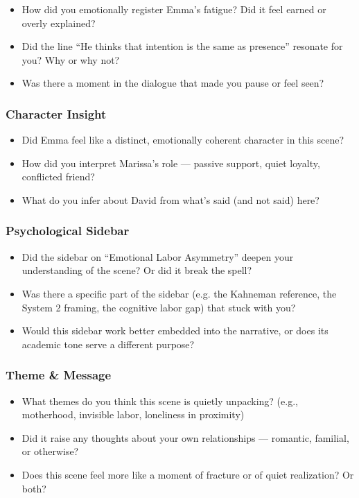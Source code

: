 \begin{itemize}
  \item How did you emotionally register Emma’s fatigue? Did it feel earned or overly explained?
  \item Did the line “He thinks that intention is the same as presence” resonate for you? Why or why not?
  \item Was there a moment in the dialogue that made you pause or feel seen?
\end{itemize}

\subsubsection*{Character Insight}

\begin{itemize}
  \item Did Emma feel like a distinct, emotionally coherent character in this scene?
  \item How did you interpret Marissa’s role — passive support, quiet loyalty, conflicted friend?
  \item What do you infer about David from what’s said (and not said) here?
\end{itemize}

\subsubsection*{Psychological Sidebar}

\begin{itemize}
  \item Did the sidebar on ``Emotional Labor Asymmetry'' deepen your understanding of the scene? Or did it break the spell?
  \item Was there a specific part of the sidebar (e.g. the Kahneman reference, the System 2 framing, the cognitive labor gap) that stuck with you?
  \item Would this sidebar work better embedded into the narrative, or does its academic tone serve a different purpose?
\end{itemize}

\subsubsection*{Theme \& Message}

\begin{itemize}
  \item What themes do you think this scene is quietly unpacking? (e.g., motherhood, invisible labor, loneliness in proximity)
  \item Did it raise any thoughts about your own relationships — romantic, familial, or otherwise?
  \item Does this scene feel more like a moment of fracture or of quiet realization? Or both?
\end{itemize}

